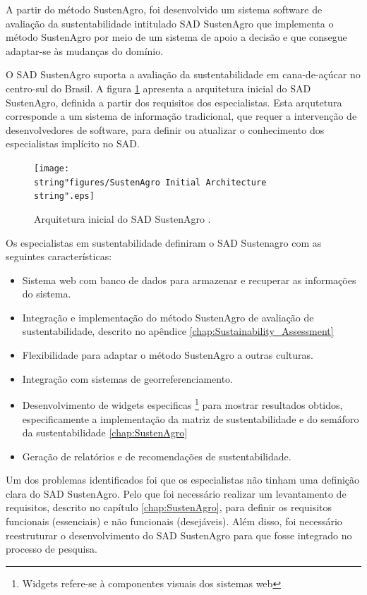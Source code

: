 A partir do método SustenAgro, foi desenvolvido um sistema software
de avaliação da sustentabilidade intitulado SAD SustenAgro que implementa
o método SustenAgro por meio de um sistema de apoio a decisão e que
consegue adaptar-se às mudanças do domínio.

O SAD SustenAgro suporta a avaliação da sustentabilidade em cana-de-açúcar
no centro-sul do Brasil. A figura \ref{fig:SustenAgro-arquitetura-inicial}
apresenta a arquitetura inicial do SAD SustenAgro, definida a partir
dos requisitos dos especialistas. Esta arqutetura corresponde a um
sistema de informação tradicional, que requer a intervenção de desenvolvedores
de software, para definir ou atualizar o conhecimento dos especialistas
implícito no SAD.

\begin{figure}[H]
\begin{centering}
\texttt{[image: \\string"figures/SustenAgro Initial Architecture\\string".eps]}
\par\end{centering}
\caption{Arquitetura inicial do SAD SustenAgro .\label{fig:SustenAgro-arquitetura-inicial}}
\end{figure}

Os especialistas em sustentabilidade definiram o SAD Sustenagro com
as seguintes características:
\begin{itemize}
\item Sistema web com banco de dados para armazenar e recuperar as informações
do sistema.
\item Integração e implementação do método SustenAgro de avaliação de sustentabilidade,
descrito no apêndice \ref{chap:Sustainability_Assessment} 
\item Flexibilidade para adaptar o método SustenAgro a outras culturas.
\item Integração com sistemas de georreferenciamento.
\item Desenvolvimento de \foreignlanguage{english}{widgets} especificas
\footnote{%
Widgets\foreignlanguage{brazil}{ refere-se à componentes visuais dos
sistemas web }%
} para mostrar resultados obtidos, especificamente a implementação
da matriz de sustentabilidade e do semáforo da sustentabilidade \foreignlanguage{english}{\ref{chap:SustenAgro}}
\item Geração de relatórios e de recomendações de sustentabilidade.
\end{itemize}
Um dos problemas identificados foi que os especialistas não tinham
uma definição clara do SAD SustenAgro. Pelo que foi necessário realizar
um levantamento de requisitos, descrito no capítulo \ref{chap:SustenAgro},
para definir os requisitos funcionais (essenciais) e não funcionais
(desejáveis). Além disso, foi necessário reestruturar o desenvolvimento
do SAD SustenAgro para que fosse integrado no processo de pesquisa.

